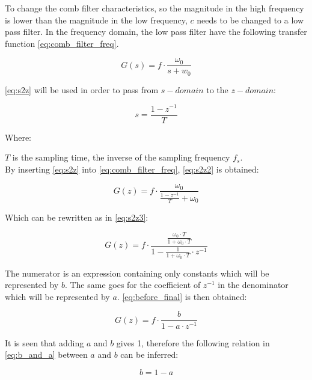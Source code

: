 To change the comb filter characteristics, so the magnitude in the high frequency is lower than the magnitude in the low frequency, $c$ needs to be changed to a low pass filter. In the frequency domain, the low pass filter have the following transfer function \autoref{eq:comb_filter_freq}. 

\begin{equation}\label{eq:comb_filter_freq}
	G(s) = f \cdot \frac{\omega_{0}}{s+w_{0}}
\end{equation}

\autoref{eq:s2z} will be used in order to pass from $s-domain$ to the $z-domain$:

\begin{equation}\label{eq:s2z}
	s = \frac{1-z^{-1}}{T}
\end{equation}

Where:

$T$ is the sampling time, the inverse of the sampling frequency $f_{s}$. \\

By inserting \autoref{eq:s2z} into \autoref{eq:comb_filter_freq}, \autoref{eq:s2z2} is obtained:

\begin{equation}\label{eq:s2z2}
	G(z) = f \cdot \frac{\omega_{0}}{\frac{1 - z^{-1}}{T} + \omega_{0}}
\end{equation}

Which can be rewritten as in \autoref{eq:s2z3}:

\begin{equation}\label{eq:s2z3}
	G(z) = f \cdot \frac{\frac{\omega_{0} \cdot T}{1 + \omega_{0} \cdot T}}{1 - \frac{1}{1+ \omega_{0} \cdot T} \cdot z^{-1}}
\end{equation}

The numerator is an expression containing only constants which will be represented by $b$. The same goes for the coefficient of $z^{-1}$ in the denominator which will be represented by $a$. \autoref{eq:before_final} is then obtained:

\begin{equation}\label{eq:before_final}
	G(z) = f \cdot \frac{b}{1 - a \cdot z^{-1}}
\end{equation}

It is seen that adding $a$ and $b$ gives 1, therefore the following relation in \autoref{eq:b_and_a} between $a$ and $b$ can be inferred:

\begin{equation}\label{eq:b_and_a}
	b = 1 - a
\end{equation} 

